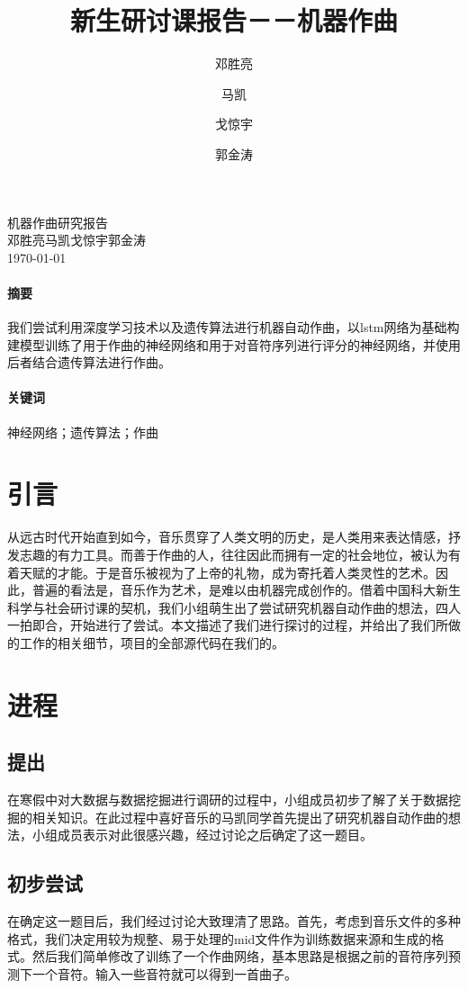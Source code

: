 \documentclass{article}
\title{新生研讨课报告－－机器作曲}
\author{邓胜亮\and 马凯\and 戈惊宇\and 郭金涛}
\begin{document}
\begin{titlepage}
\centering
{}
{\fontsize{40}{50} 机器作曲研究报告}\\
{\Large 邓胜亮\quad 马凯\quad 戈惊宇\quad 郭金涛}\\
{\today}
\end{titlepage}

\paragraph{摘要}
我们尝试利用深度学习技术以及遗传算法进行机器自动作曲，以lstm网络为基础构建模型训练了用于作曲的神经网络和用于对音符序列进行评分的神经网络，并使用后者结合遗传算法进行作曲。
\paragraph{关键词} 神经网络；遗传算法；作曲

\newpage
\renewcommand{\contentsname}{目录}
\tableofcontents

\newpage
\section{引言}
从远古时代开始直到如今，音乐贯穿了人类文明的历史，是人类用来表达情感，抒发志趣的有力工具。而善于作曲的人，往往因此而拥有一定的社会地位，被认为有着天赋的才能。于是音乐被视为了上帝的礼物，成为寄托着人类灵性的艺术。因此，普遍的看法是，音乐作为艺术，是难以由机器完成创作的。借着中国科大新生科学与社会研讨课的契机，我们小组萌生出了尝试研究机器自动作曲的想法，四人一拍即合，开始进行了尝试。本文描述了我们进行探讨的过程，并给出了我们所做的工作的相关细节，项目的全部源代码在我们的\cite{musinet}。
\section{进程}
    \subsection{提出}
    在寒假中对大数据与数据挖掘进行调研的过程中，小组成员初步了解了关于数据挖掘的相关知识。在此过程中喜好音乐的马凯同学首先提出了研究机器自动作曲的想法，小组成员表示对此很感兴趣，经过讨论之后确定了这一题目。
    \subsection{初步尝试}
    在确定这一题目后，我们经过讨论大致理清了思路。首先，考虑到音乐文件的多种格式，我们决定用较为规整、易于处理的mid文件作为训练数据来源和生成的格式。然后我们简单修改了\cite{char-rnn}训练了一个作曲网络，基本思路是根据之前的音符序列预测下一个音符。输入一些音符就可以得到一首曲子。
\end{document}
